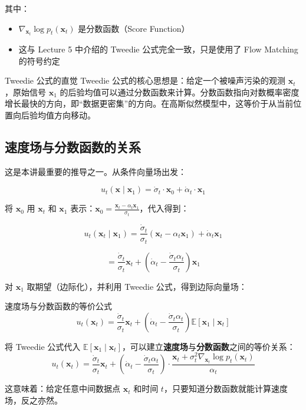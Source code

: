 其中：
\begin{itemize}
    \item $\nabla_{\mathbf{x}_t} \log p_t(\mathbf{x}_t)$ 是分数函数（Score Function）
    \item 这与 Lecture 5 中介绍的 Tweedie 公式完全一致，只是使用了 Flow Matching 的符号约定
\end{itemize}

\begin{knowledgebox}{Tweedie 公式的直觉}
Tweedie 公式的核心思想是：给定一个被噪声污染的观测 $\mathbf{x}_t$，原始信号 $\mathbf{x}_1$ 的后验均值可以通过分数函数来计算。分数函数指向对数概率密度增长最快的方向，即``数据更密集''的方向。在高斯似然模型中，这等价于从当前位置向后验均值方向移动。
\end{knowledgebox}

\subsection{速度场与分数函数的关系}

这是本讲最重要的推导之一。从条件向量场出发：

$$u_t(\mathbf{x} \mid \mathbf{x}_1) = \dot{\sigma}_t \cdot \mathbf{x}_0 + \dot{\alpha}_t \cdot \mathbf{x}_1$$

将 $\mathbf{x}_0$ 用 $\mathbf{x}_t$ 和 $\mathbf{x}_1$ 表示：$\mathbf{x}_0 = \frac{\mathbf{x}_t - \alpha_t \mathbf{x}_1}{\sigma_t}$，代入得到：

$$u_t(\mathbf{x}_t \mid \mathbf{x}_1) = \frac{\dot{\sigma}_t}{\sigma_t}(\mathbf{x}_t - \alpha_t \mathbf{x}_1) + \dot{\alpha}_t \mathbf{x}_1$$

$$= \frac{\dot{\sigma}_t}{\sigma_t} \mathbf{x}_t + \left(\dot{\alpha}_t - \frac{\dot{\sigma}_t \alpha_t}{\sigma_t}\right) \mathbf{x}_1$$

对 $\mathbf{x}_1$ 取期望（边际化），并利用 Tweedie 公式，得到边际向量场：

\begin{importantbox}{速度场与分数函数的等价公式}
$$u_t(\mathbf{x}_t) = \frac{\dot{\sigma}_t}{\sigma_t} \mathbf{x}_t + \left(\dot{\alpha}_t - \frac{\dot{\sigma}_t \alpha_t}{\sigma_t}\right) \mathbb{E}[\mathbf{x}_1 \mid \mathbf{x}_t]$$

将 Tweedie 公式代入 $\mathbb{E}[\mathbf{x}_1 \mid \mathbf{x}_t]$，可以建立\textbf{速度场}与\textbf{分数函数}之间的等价关系：
$$u_t(\mathbf{x}_t) = \frac{\dot{\sigma}_t}{\sigma_t} \mathbf{x}_t + \left(\dot{\alpha}_t - \frac{\dot{\sigma}_t \alpha_t}{\sigma_t}\right) \cdot \frac{\mathbf{x}_t + \sigma_t^2 \nabla_{\mathbf{x}_t} \log p_t(\mathbf{x}_t)}{\alpha_t}$$

这意味着：给定任意中间数据点 $\mathbf{x}_t$ 和时间 $t$，只要知道分数函数就能计算速度场，反之亦然。
\end{importantbox}


